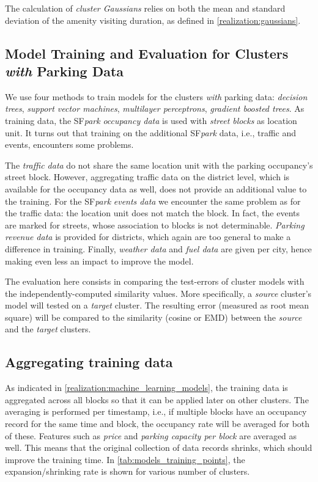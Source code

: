 The calculation of \textit{cluster Gaussians} relies on both the mean and standard deviation of the amenity visiting duration, as defined in \ref{realization:gaussians}.

\subsection{Model Training and Evaluation for Clusters \emph{with} Parking Data}
\label{evaluation:model_training}
We use four methods to train models for the clusters \textit{with} parking data: \textit{decision trees}, \textit{support vector machines}, \textit{multilayer perceptrons}, \textit{gradient boosted trees}. As training data, the SF\textit{park} \textit{occupancy data} is used with \textit{street blocks} as location unit. It turns out that training on the additional SF\textit{park} data, i.e., traffic and events, encounters some problems. 

The \textit{traffic data} do not share the same location unit with the parking occupancy's street block. However, aggregating traffic data on the district level, which is available for the occupancy data as well, does not provide an additional value to the training. For the SF\textit{park} \textit{events data} we encounter the same problem as for the traffic data: the location unit does not match the block.
In fact, the events are marked for streets, whose association to blocks is not determinable. \textit{Parking revenue data} is provided for districts, which again are too general to make a difference in training.
Finally, \textit{weather data} and \textit{fuel data} are given per city, hence making even less an impact to improve the model.

The evaluation here consists in comparing the test-errors of cluster models with the independently-computed similarity values. More specifically, a \textit{source} cluster's model will tested on a \textit{target} cluster. The resulting error (measured as root mean square) will be compared to the similarity (cosine or EMD) between the \textit{source} and the \textit{target} clusters.  

\subsection{Aggregating training data}
\label{evaluation:aggregating_training_data}
As indicated in \ref{realization:machine_learning_models}, the training data is aggregated across all blocks so that it can be applied later on other clusters. The averaging is performed per timestamp, i.e., if multiple blocks have an occupancy record for the same time and block, the occupancy rate will be averaged for both of these. Features such as \textit{price} and \textit{parking capacity per block} are averaged as well. This means that the original collection of data records shrinks, which should improve the training time. In \ref{tab:models_training_points}, the expansion/shrinking rate is shown for various number of clusters.

